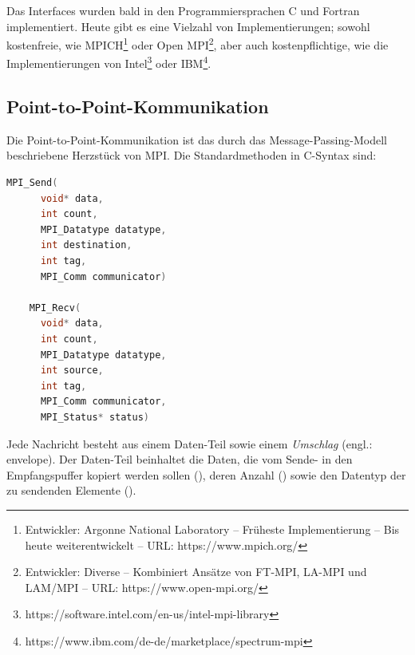       Das Interfaces wurden bald in den Programmiersprachen C und Fortran implementiert. Heute gibt es eine Vielzahl von Implementierungen; sowohl kostenfreie, wie  
      MPICH\footnote{Entwickler: Argonne National Laboratory -- Früheste Implementierung -- Bis heute weiterentwickelt -- URL: https://www.mpich.org/} oder
      Open MPI\footnote{Entwickler: Diverse -- Kombiniert Ansätze von FT-MPI, LA-MPI und LAM/MPI -- URL: https://www.open-mpi.org/},
      aber auch kostenpflichtige, wie die Implementierungen von Intel\footnote{https://software.intel.com/en-us/intel-mpi-library} oder IBM\footnote{https://www.ibm.com/de-de/marketplace/spectrum-mpi}. 
      
    \subsection{Point-to-Point-Kommunikation}
    \label{sec:ptpkom}
    Die Point-to-Point-Kommunikation ist das durch das Message-Passing-Modell beschriebene Herzstück von MPI.  
    Die Standardmethoden in C-Syntax sind:
    \begin{lstlisting}[language=C, label=lst:p2p_standard, caption={Die Syntax der standard Sende- und Empfangsoperationen}, numbers=none]
	MPI_Send(
	  void* data,
	  int count,
	  MPI_Datatype datatype,
	  int destination,
	  int tag,
	  MPI_Comm communicator)

	MPI_Recv(
	  void* data,
	  int count,
	  MPI_Datatype datatype,
	  int source,
	  int tag,
	  MPI_Comm communicator,
	  MPI_Status* status)

    \end{lstlisting}
    
    Jede Nachricht besteht aus einem Daten-Teil sowie einem \textit{Umschlag} (engl.: envelope). Der Daten-Teil beinhaltet die Daten, die vom Sende- in den Empfangspuffer kopiert
    werden sollen (), deren Anzahl () sowie den Datentyp der zu sendenden Elemente (). \citep{mpiv31}
    
